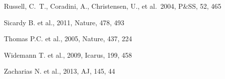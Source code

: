 \documentclass[useAMS,usenatbib]{mn2e}
\begin{document}
\begin{thebibliography}{99}

 Russell, C.~T., Coradini, A., Christensen, U., et al.\ 2004, P\&SS, 52, 465 


 Sicardy B. et al., 2011,
Nature, 478, 493

 Thomas P.C. et al., 2005,
Nature, 437, 224


 Widemann T. et al., 2009,
Icarus, 199, 458


 Zacharias N. et al., 2013,
AJ, 145, 44



\end{thebibliography}




\label{lastpage}
\end{document}
